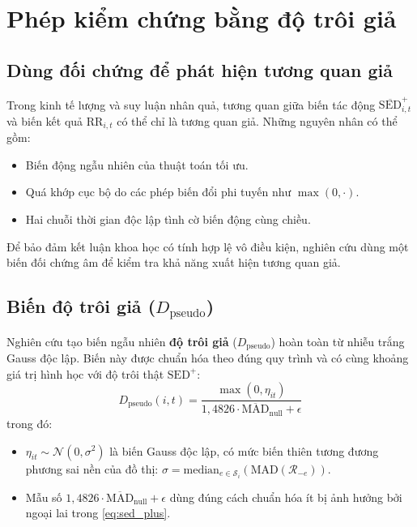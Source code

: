 \section{Phép kiểm chứng bằng độ trôi giả}
\label{sec:falsification_pseudo_drift}

\subsection{Dùng đối chứng để phát hiện tương quan giả}
Trong kinh tế lượng và suy luận nhân quả, tương quan giữa biến tác động $\overline{\text{SED}}^+_{i,t}$ và biến kết quả $\text{RR}_{i,t}$ có thể chỉ là tương quan giả. Những nguyên nhân có thể gồm:
\begin{itemize}
    \item Biến động ngẫu nhiên của thuật toán tối ưu.
    \item Quá khớp cục bộ do các phép biến đổi phi tuyến như $\max(0, \cdot)$.
    \item Hai chuỗi thời gian độc lập tình cờ biến động cùng chiều.
\end{itemize}
Để bảo đảm kết luận khoa học có tính hợp lệ vô điều kiện, nghiên cứu dùng một biến đối chứng âm để kiểm tra khả năng xuất hiện tương quan giả.

\subsection{Biến độ trôi giả (\texorpdfstring{$D_{\text{pseudo}}$}{D\_pseudo})}
Nghiên cứu tạo biến ngẫu nhiên \textbf{độ trôi giả} ($D_{\text{pseudo}}$) hoàn toàn từ nhiễu trắng Gauss độc lập. Biến này được chuẩn hóa theo đúng quy trình và có cùng khoảng giá trị hình học với độ trôi thật $\text{SED}^+$:
\begin{equation}
D_{\text{pseudo}}(i, t) = \frac{\max\left(0, \eta_{it}\right)}{1{,}4826 \cdot \overline{\text{MAD}}_{\text{null}} + \epsilon}
\label{eq:pseudo_drift_def}
\end{equation}
trong đó:
\begin{itemize}
    \item $\eta_{it} \sim \mathcal{N}(0, \sigma^2)$ là biến Gauss độc lập, có mức biến thiên tương đương phương sai nền của đồ thị: $\sigma = \text{median}_{e \in \mathcal{S}_i}(\text{MAD}(\mathcal{R}_{-e}))$.
    \item Mẫu số $1{,}4826 \cdot \overline{\text{MAD}}_{\text{null}} + \epsilon$ dùng đúng cách chuẩn hóa ít bị ảnh hưởng bởi ngoại lai trong \eqref{eq:sed_plus}.
\end{itemize}


